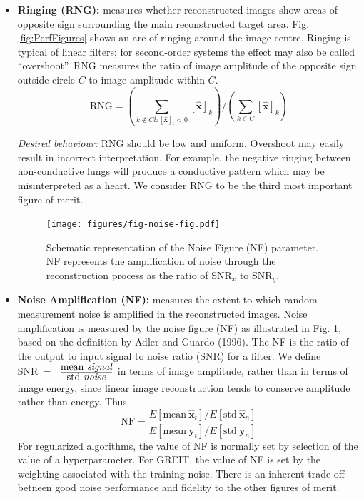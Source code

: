 \documentclass[12pt]{iopart}
\newcommand{\xH}{\mbox{$\mathbf{\hat x}$}}
\newcommand{\yB}{\mbox{$\mathbf{y}$}}
\begin{document}
\begin{itemize}
\hspace{5mm}
{\em Desired behaviour:}
SD should be low and uniform. Large SD may result in
incorrect interpretation of images, although this
effect is less important than other artefacts. We 
consider SD to be the fifth most important figure 
of merit.

\item
{\bf Ringing (RNG):}
measures whether reconstructed images show
areas of opposite sign surrounding the main 
reconstructed target area. Fig. \ref{fig:PerfFigures}
shows an arc of ringing around the image centre.
Ringing is typical of linear filters; for second-order
systems the effect may also be called ``overshoot''.
RNG measures the ratio of image amplitude of
the opposite sign outside circle $C$ to image
amplitude within $C$.
\begin{equation}
\mathrm{RNG} =
\left(
        \sum_{k\not\in C \& [\xH]_i < 0} [\xH]_k 
\right)
/ 
\left(
        \sum_{k\in C}                    [\xH]_k 
\right)
\end{equation}

\hspace{5mm}
{\em Desired behaviour:}
RNG should be low and uniform. Overshoot may
easily result in incorrect interpretation. For
example, the negative ringing between non-conductive
lungs will produce a conductive pattern which 
may be misinterpreted as a heart.
We consider RNG to be the third most important figure 
of merit.

\begin{figure}[bhtp]
\begin{center}
\texttt{[image: figures/fig-noise-fig.pdf]}
\caption{ \label{fig:noise_fig}
Schematic representation of the Noise Figure (NF)
parameter. NF represents the amplification of noise through
the reconstruction process as the ratio of SNR$_x$ to SNR$_y$.
}
\end{center}
\end{figure}

\item
{\bf Noise Amplification (NF):}
measures the extent to which random
measurement noise is amplified
in the reconstructed images. Noise amplification
is measured by the noise figure (NF) as
illustrated in Fig. \ref{fig:noise_fig}, 
based on the definition by Adler and Guardo (1996).
The NF is the ratio of the output to input
 signal to noise ratio (SNR) for a filter.
We define SNR~=~%
$\frac{
   \mbox{{\rm mean} \em signal}
      }{
   \mbox{{\rm std} \em noise}
     }
$ 
in terms of image amplitude,
rather than in terms of image energy, since linear
image reconstruction tends to conserve  amplitude
rather than energy. Thus
\begin{equation}
\mathrm{NF} = \frac{
   E[ \mathrm{mean}~\xH_t ] 
         /
   E[ \mathrm{std}~\xH_n ]
}{
   E[ \mathrm{mean}~\yB_t ] 
         /
   E[ \mathrm{std}~\yB_n ]
}
\end{equation}
For regularized algorithms, the value of NF is normally
set by selection of the value of 
a hyperparameter. For GREIT, the value of NF is set by the weighting
associated with the training noise. There is an inherent
trade-off betneen good noise performance and fidelity to
the other figures of merit.


\end{itemize}
\end{document}
